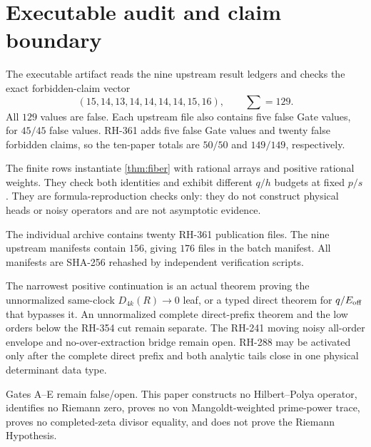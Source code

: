 \documentclass[11pt]{article}
\theoremstyle{definition}
\theoremstyle{remark}
\begin{document}
\section{Executable audit and claim boundary}

The executable artifact reads the nine upstream result ledgers and checks
the exact forbidden-claim vector
\begin{equation}\label{eq:false-counts}
 (15,14,13,14,14,14,14,15,16),
 \qquad \sum=129.
\end{equation}
All $129$ values are false.  Each upstream file also contains five false
Gate values, for $45/45$ false values.  RH-361 adds five false Gate values
and twenty false forbidden claims, so the ten-paper totals are $50/50$ and
$149/149$, respectively.

The finite rows instantiate \cref{thm:fiber} with rational arrays and
positive rational weights.  They check both identities and exhibit different
$q/h$ budgets at fixed $p/s$.  They are formula-reproduction checks only:
they do not construct physical heads or noisy operators and are not
asymptotic evidence.

The individual archive contains twenty RH-361 publication files.  The nine
upstream manifests contain $156$, giving $176$ files in the batch manifest.
All manifests are SHA-256 rehashed by independent verification scripts.

The narrowest positive continuation is an actual theorem proving the
unnormalized same-clock $D_{4k}(R)\to0$ leaf, or a typed direct theorem for
$q/E_{\rm off}$ that bypasses it.  An unnormalized complete direct-prefix
theorem and the low orders below the RH-354 cut remain separate.  The
RH-241 moving noisy all-order envelope and no-over-extraction bridge remain
open.  RH-288 may be activated only after the complete direct prefix and
both analytic tails close in one physical determinant data type.

Gates A--E remain false/open.  This paper constructs no Hilbert--Polya
operator, identifies no Riemann zero, proves no von Mangoldt-weighted
prime-power trace, proves no completed-zeta divisor equality, and does not
prove the Riemann Hypothesis.



\end{document}
